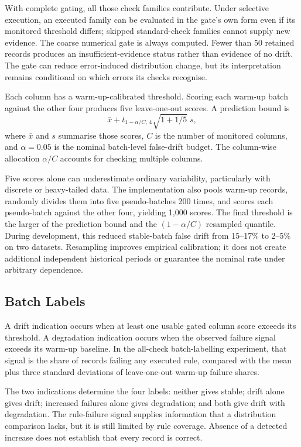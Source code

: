 With complete gating, all those check families contribute. Under selective execution, an executed family can be evaluated in the gate's own form even if its monitored threshold differs; skipped standard-check families cannot supply new evidence. The coarse numerical gate is always computed. Fewer than 50 retained records produces an insufficient-evidence status rather than evidence of no drift. The gate can reduce error-induced distribution change, but its interpretation remains conditional on which errors its checks recognise.

Each column has a warm-up-calibrated threshold. Scoring each warm-up batch against the other four produces five leave-one-out scores. A prediction bound is
\[
\bar{x}+t_{1-\alpha/C,\,4}\sqrt{1+1/5}\;s,
\]
where $\bar{x}$ and $s$ summarise those scores, $C$ is the number of monitored columns, and $\alpha=0.05$ is the nominal batch-level false-drift budget. The column-wise allocation $\alpha/C$ accounts for checking multiple columns.

Five scores alone can underestimate ordinary variability, particularly with discrete or heavy-tailed data. The implementation also pools warm-up records, randomly divides them into five pseudo-batches 200 times, and scores each pseudo-batch against the other four, yielding 1,000 scores. The final threshold is the larger of the prediction bound and the $(1-\alpha/C)$ resampled quantile. During development, this reduced stable-batch false drift from 15--17\% to 2--5\% on two datasets. Resampling improves empirical calibration; it does not create additional independent historical periods or guarantee the nominal rate under arbitrary dependence.

\subsection{Batch Labels}
\label{sec:method:labels}

A drift indication occurs when at least one usable gated column score exceeds its threshold. A degradation indication occurs when the observed failure signal exceeds its warm-up baseline. In the all-check batch-labelling experiment, that signal is the share of records failing any executed rule, compared with the mean plus three standard deviations of leave-one-out warm-up failure shares.

The two indications determine the four labels: neither gives stable; drift alone gives drift; increased failures alone gives degradation; and both give drift with degradation. The rule-failure signal supplies information that a distribution comparison lacks, but it is still limited by rule coverage. Absence of a detected increase does not establish that every record is correct.

